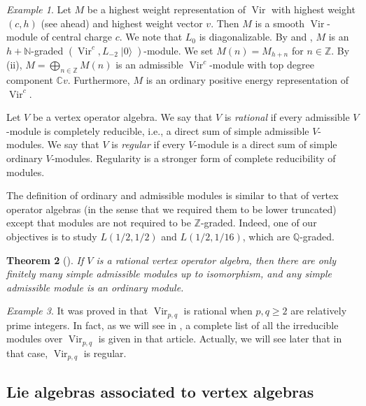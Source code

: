 \documentclass[a4paper, 12pt, reqno]{amsart}
\newtheorem{theorem}{Theorem}[section]
\theoremstyle{remark}
\newtheorem{example}[theorem]{Example}
\DeclareMathOperator{\Vir}{Vir}
\DeclareMathOperator{\vac}{|0\rangle}
\begin{document}
\begin{example}
  \label{exa:11}
  Let $M$ be a highest weight representation of $\Vir$ with highest weight $(c, h)$ (see  ahead) and highest weight vector $v$.
  Then $M$ is a smooth $\Vir$-module of central charge $c$.
  We note that $L_0$ is diagonalizable.
  By  and , $M$ is an $h + \mathbb{N}$-graded $(\Vir^c, L_{-2}\vac)$-module.
  We set $M(n) = M_{h + n}$ for $n \in \mathbb{Z}$.
  By (ii), $M = \bigoplus_{n \in \mathbb{Z}}M(n)$ is an admissible $\Vir^c$-module with top degree component $\mathbb{C}v$.
  Furthermore, $M$ is an ordinary positive energy representation of $\Vir^c$.
\end{example}

Let $V$ be a vertex operator algebra.
We say that $V$ is \emph{rational} if every admissible $V$-module is completely reducible, i.e., a direct sum of simple admissible $V$-modules.
We say that $V$ is \emph{regular} if every $V$-module is a direct sum of simple ordinary $V$-modules.
Regularity is a stronger form of complete reducibility of modules.

The definition of ordinary and admissible modules is similar to that of vertex operator algebras (in the sense that we required them to be lower truncated) except that modules are not required to be $\mathbb{Z}$-graded.
Indeed, one of our objectives is to study $L(1/2, 1/2)$ and $L(1/2, 1/16)$, which are $\mathbb{Q}$-graded.

\begin{theorem}[{\cite{dong_twisted_1998}}]
  \label{thr:28}
  If $V$ is a rational vertex operator algebra, then there are only finitely many simple admissible modules up to isomorphism, and any simple admissible module is an ordinary module.
\end{theorem}

\begin{example}
  \label{exa:12}
  It was proved in \cite{wang_rationality_1993} that $\Vir_{p, q}$ is rational when $p, q \ge 2$ are relatively prime integers.
  In fact, as we will see in , a complete list of all the irreducible modules over $\Vir_{p, q}$ is given in that article.
  Actually, we will see later that in that case, $\Vir_{p, q}$ is regular.
\end{example}

\subsection{Lie algebras associated to vertex algebras}
\label{sec:lie-algebr-assoc}
\end{document}
